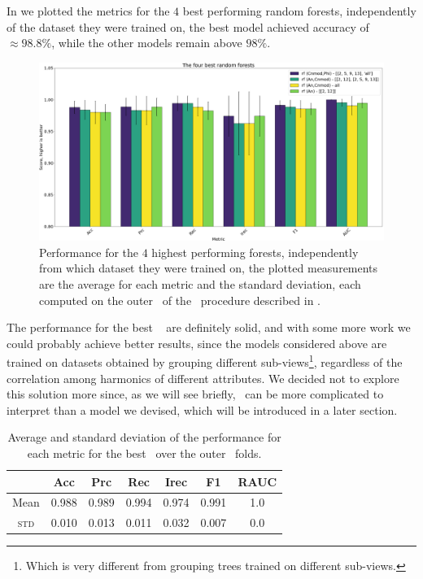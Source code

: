 In  we plotted the metrics for the $4$ best performing random forests,
independently of the dataset they were trained on, the best model achieved accuracy of $\approx 98.8\%$, while the other models remain above $98\%$.
\begin{figure}[!ht]
	\centering
	\includegraphics[width=\linewidth]{img/best_rfs.png}
	\caption{Performance for the $4$ highest performing forests, independently from which
		dataset they were trained on, the plotted measurements are the average for each metric and
		the standard deviation, each computed on the outer \cv\ of the \ncv\ procedure described in
		.} \label{fig:best-rfs}
\end{figure}
The performance for the best \rf\  are definitely solid, and with some more work we could probably achieve better
results, since the models considered above are trained on datasets obtained by grouping
different sub-views\footnote{Which is very different from grouping trees trained on different
	sub-views.}, regardless of the correlation among harmonics of different attributes. We
decided not to explore this solution more since, as we will see briefly, \rfs\ can be more
complicated to interpret than a model we devised, which will be introduced in a later section.
\begin{table}[!ht]
	\caption{Average and standard deviation of the performance for each metric for the best \rf\ over the outer \cv\
		folds.}\label{tbl:rf-cnmod-phi-perf}

	\bigskip
	\setlength{\tabcolsep}{6pt}
	\centering
	\begin{tabular}{ccccccc}
		\toprule
		\textbf{}    & \textbf{Acc} & \textbf{Prc} & \textbf{Rec} & \textbf{Irec} & \textbf{F1} & \textbf{RAUC} \\
		\midrule
		Mean         & 0.988        & 0.989        & 0.994        & 0.974         & 0.991
		             & 1.0                                                                                      \\
		\textsc{std} & 0.010        & 0.013        & 0.011        & 0.032         & 0.007
		             & 0.0                                                                                      \\
		\bottomrule
	\end{tabular}
\end{table}
